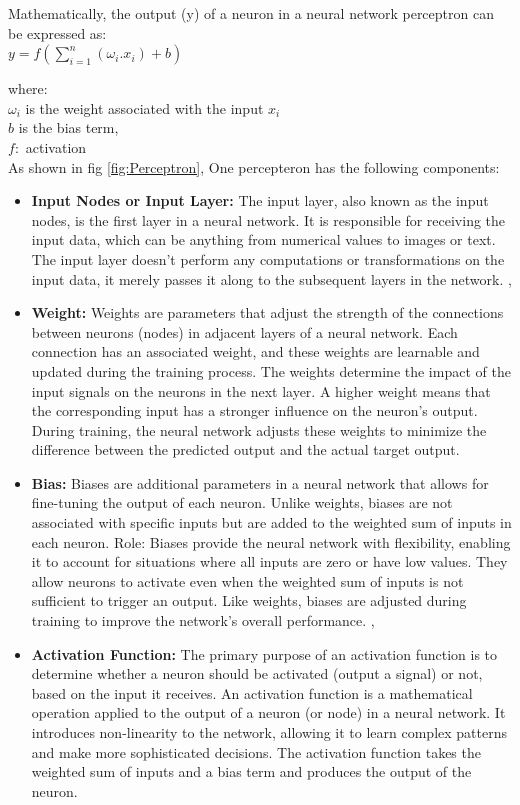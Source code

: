 Mathematically, the output (y) of a neuron in a neural network perceptron can be expressed as:\\

\(y=f(\sum_{i=1}^{n}(\omega_{i}.x_{i})+b)\)

where:\\
$\omega_{i}$ is the weight associated with the input \(x_{i}\)\\
\(b\) is the bias term,\\
\(f:\) activation\\
As shown in fig \ref{fig:Perceptron}, One percepteron has the following components: \\
\begin{itemize}
    \item \textbf{Input Nodes or Input Layer: } The input layer, also known as the input nodes, is the first layer in a neural network. It is responsible for receiving the input data, which can be anything from numerical values to images or text. The input layer doesn't perform any computations or transformations on the input data, it merely passes it along to the subsequent layers in the network. \cite{ansari2020building}, \cite{nielsen2015neural}\\
    \item \textbf{Weight: } Weights are parameters that adjust the strength of the connections between neurons (nodes) in adjacent layers of a neural network. Each connection has an associated weight, and these weights are learnable and updated during the training process. The weights determine the impact of the input signals on the neurons in the next layer. A higher weight means that the corresponding input has a stronger influence on the neuron's output. During training, the neural network adjusts these weights to minimize the difference between the predicted output and the actual target output. \\
    \item \textbf{Bias: } Biases are additional parameters in a neural network that allows for fine-tuning the output of each neuron. Unlike weights, biases are not associated with specific inputs but are added to the weighted sum of inputs in each neuron.
    Role: Biases provide the neural network with flexibility, enabling it to account for situations where all inputs are zero or have low values. They allow neurons to activate even when the weighted sum of inputs is not sufficient to trigger an output. Like weights, biases are adjusted during training to improve the network's overall performance. \cite{ansari2020building}, \cite{nielsen2015neural}\\
    \item \textbf{Activation Function: } The primary purpose of an activation function is to determine whether a neuron should be activated (output a signal) or not, based on the input it receives.
    An activation function is a mathematical operation applied to the output of a neuron (or node) in a neural network. It introduces non-linearity to the network, allowing it to learn complex patterns and make more sophisticated decisions. The activation function takes the weighted sum of inputs and a bias term and produces the output of the neuron.\cite{nielsen2015neural}


\end{itemize}
